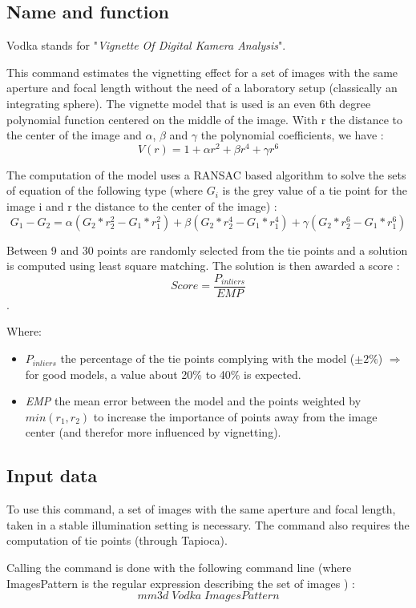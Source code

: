 \subsection{Name and function}
Vodka stands for "\textit{Vignette Of Digital Kamera Analysis}".

This command estimates the vignetting effect for a set of images with the same aperture and focal length without the need of a laboratory setup (classically an integrating sphere). The vignette model that is used is an even 6th degree polynomial function centered on the middle of the image. With r the distance to the center of the image and $\alpha$, $\beta$ and $\gamma$ the polynomial coefficients, we have : \[V(r)=1+ \alpha r^2 + \beta r^4 + \gamma r^6\]


The computation of the model uses a RANSAC based algorithm to solve the sets of equation of the following type (where $G_{i}$ is the grey value of a tie point for the image i and r the distance to the center of the image) : \[ G_{1}-G_{2}=\alpha(G_{2}*r_{2}^2-G_{1}*r_{1}^2)+\beta(G_{2}*r_{2}^4-G_{1}*r_{1}^4)+\gamma(G_{2}*r_{2}^6-G_{1}*r_{1}^6) \]

Between 9 and 30 points are randomly selected from the tie points and a solution is computed using least square matching. The solution is then awarded a score : \[Score=\frac{P_{inliers}}{EMP}\].

Where:
\begin{itemize}
\item \textit{$P_{inliers}$} the percentage of the tie points complying with the model ($\pm 2\%$) $\Rightarrow$ for good models, a value about 20\% to 40\% is expected.

\item \textit{EMP} the mean error between the model and the points weighted by $min(r_{1},r_{2})$ to increase the importance of points away from the image center (and therefor more influenced by vignetting).
\end{itemize}


\subsection{Input data}
To use this command, a set of images with the same aperture and focal length, taken in a stable illumination setting is necessary. The command also requires the computation of tie points (through Tapioca).


Calling the command is done with the following command line (where ImagesPattern is the regular expression describing the set of images ) : \[mm3d\;Vodka\;ImagesPattern\]

